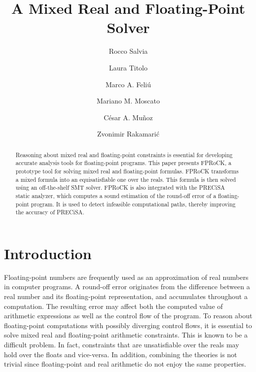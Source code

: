 \documentclass[runningheads,american,orivec,fleqn]{llncs}
\begin{document}
\title{A Mixed Real and Floating-Point Solver}

\author{Rocco Salvia \and Laura Titolo \and  Marco A. Feli\'{u} \and Mariano M. Moscato \and C\'{e}sar A. Mu\~{n}oz \and Zvonimir Rakamari\'c}



\maketitle

\begin{abstract}
Reasoning about mixed real and floating-point constraints is essential
for developing accurate analysis tools for floating-point
programs. This paper presents FPRoCK, a prototype tool for solving
mixed real and floating-point formulas. FPRoCK transforms a mixed
formula into an equisatisfiable one over the reals. This
formula is then solved using an off-the-shelf SMT solver.
FPRoCK is also integrated with the PRECiSA static analyzer,
which computes a sound estimation of the round-off error of a
floating-point program. It is used to detect infeasible
computational paths, thereby improving the accuracy of PRECiSA.
\end{abstract}

\section{Introduction}
\label{sec:intro}
% 
Floating-point numbers are frequently used as an approximation of real numbers in computer programs.
%
A round-off error originates from the difference between a real number and its floating-point representation, and accumulates throughout a computation. The resulting error may affect both the computed value of arithmetic expressions as well as the control flow of the program.
% 
To reason about floating-point computations with possibly diverging control flows, it is essential to solve mixed real and floating-point arithmetic constraints.
%
This is known to be a difficult problem. In fact, constraints that are unsatisfiable over the reals may hold over the floats and vice-versa. In addition, combining the theories is not trivial since floating-point and real arithmetic do not enjoy the same properties.
\end{document}
